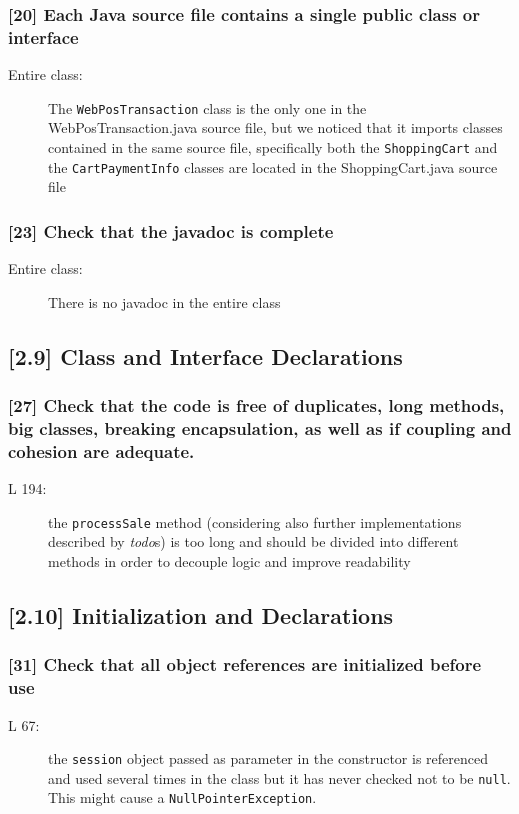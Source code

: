 \subsubsection*{[20] Each Java source file contains a single public class or interface}
\begin{description}
	\item[Entire class:] The {\tt WebPosTransaction} class is the only one in the WebPosTransaction.java source file, but we noticed that it imports classes contained in the same source file, specifically both the {\tt ShoppingCart} and the {\tt CartPaymentInfo} classes are located in the ShoppingCart.java source file
\end{description}

\subsubsection*{[23] Check that the javadoc is complete}
\begin{description}
	\item[Entire class:] There is no javadoc in the entire class
\end{description}

\subsection*{[2.9] Class and Interface Declarations}
\subsubsection*{[27] Check that the code is free of duplicates, long methods, big classes, breaking encapsulation, as well as if coupling and cohesion are adequate.}
\begin{description}
	\item[L 194:] the {\tt processSale} method (considering also further implementations described by \emph{todo}s) is too long and should be divided into different methods in order to decouple logic and improve readability
\end{description}

\subsection*{[2.10] Initialization and Declarations}
\subsubsection*{[31] Check that all object references are initialized before use}
\begin{description}
	\item[L 67:] the {\tt session} object passed as parameter in the constructor is referenced and used several times in the class but it has never checked not to be {\tt null}. This might cause a {\tt NullPointerException}.
\end{description} 


